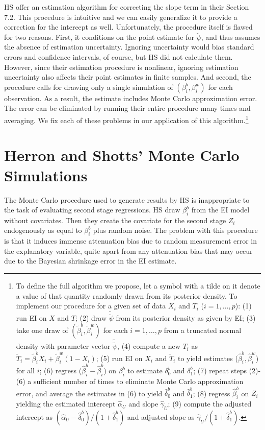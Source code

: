 \documentclass[11pt,titlepage]{article}
\newcommand{\psiu}{\breve{\psi}}
\begin{document}
HS offer an estimation algorithm for correcting the slope term in
their Section 7.2.  This procedure is intuitive and we can easily
generalize it to provide a correction for the intercept as well.
Unfortunately, the procedure itself is flawed for two reasons.  First,
it conditions on the point estimate for $\breve\psi$, and thus assumes
the absence of estimation uncertainty.  Ignoring uncertainty would
bias standard errors and confidence intervals, of course, but HS did
not calculate them.  However, since their estimation procedure is
nonlinear, ignoring estimation uncertainty also affects their point
estimates in finite samples.  And second, the procedure calls for
drawing only a single simulation of $(\beta_i^b,\beta_i^w)$ for each
observation.  As a result, the estimate includes Monte Carlo
approximation error.  The error can be eliminated by running their
entire procedure many times and averaging.  We fix each of these
problems in our application of this algorithm.\footnote{To define the
  full algorithm we propose, let a symbol with a tilde on it denote a
  value of that quantity randomly drawn from its posterior density.
  To implement our procedure for a given set of data $X_i$ and $T_i$
  ($i=1,\dots,p$): (1) run EI on $X$ and $T$; (2) draw $\tilde\psiu$
  from its posterior density as given by EI; (3) take one draw of
  $(\tilde\beta_i^b,\tilde\beta_i^w)$ for each $i=1,\dots,p$ from a
  truncated normal density with parameter vector $\tilde\psiu$, (4)
  compute a new $T_i$ as $\tilde
  T_i=\tilde\beta_i^bX_i+\tilde\beta_i^w(1-X_i)$; (5) run EI on $X_i$ and
  $\tilde T_i$ to yield estimates ($\hat\beta_i^b,\hat\beta_i^w$) for
  all $i$; (6) regress ($\hat\beta_i^b-\hat\beta_i^b$) on $\beta_i^b$
  to estimate $\delta_0^b$ and $\delta_1^b$; (7) repeat steps (2)-(6)
  a sufficient number of times to eliminate Monte Carlo approximation
  error, and average the estimates in (6) to yield $\hat\delta_0^b$
  and $\hat\delta_1^b$; (8) regress $\hat\beta_i^b$ on $Z_i$ yielding
  the estimated intercept $\hat\alpha_U$ and slope $\hat\gamma_U$; (9)
  compute the adjusted intercept as
  $(\hat\alpha_U-\hat\delta_0^b)/(1+\hat\delta_1^b)$ and adjusted
  slope as $\hat\gamma_U/(1+\hat\delta_1^b)$.}

\section{Herron and Shotts' Monte Carlo Simulations}

The Monte Carlo procedure used to generate results by HS is
inappropriate to the task of evaluating second stage regressions.  HS
draw $\beta_i^b$ from the EI model without covariates.  Then they
create the covariate for the second stage $Z_i$ endogenously as equal
to $\beta_i^b$ plus random noise.  The problem with this procedure is
that it induces immense attenuation bias due to random measurement
error in the explanatory variable, quite apart from any attenuation
bias that may occur due to the Bayesian shrinkage error in the EI
estimate.
\end{document}
